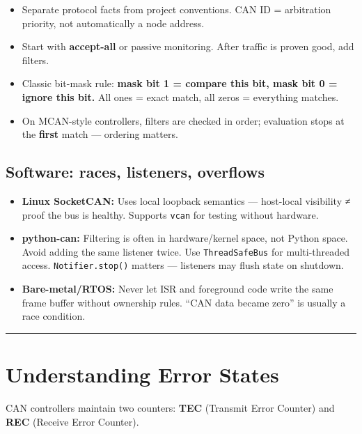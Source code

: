 \documentclass[12pt,a4paper,oneside]{report}
\providecommand{\tightlist}{\setlength{\itemsep}{0pt}\setlength{\parskip}{0pt}}
\begin{document}
\begin{itemize}
\tightlist
\item
  Separate protocol facts from project conventions. CAN ID = arbitration
  priority, not automatically a node address.
\item
  Start with \textbf{accept-all} or passive monitoring. After traffic is proven
  good, add filters.
\item
  Classic bit-mask rule: \textbf{mask bit 1 = compare this bit, mask bit 0 =
  ignore this bit.} All ones = exact match, all zeros = everything matches.
\item
  On MCAN-style controllers, filters are checked in order; evaluation stops at
  the \textbf{first} match --- ordering matters.
\end{itemize}

\subsection{Software: races, listeners,
overflows}\label{software-races-listeners-overflows}

\begin{itemize}
\tightlist
\item
  \textbf{Linux SocketCAN:} Uses local loopback semantics --- host-local
  visibility ≠ proof the bus is healthy. Supports \texttt{vcan} for testing
  without hardware.
\item
  \textbf{python-can:} Filtering is often in hardware/kernel space, not Python
  space. Avoid adding the same listener twice. Use \texttt{ThreadSafeBus} for
  multi-threaded access. \texttt{Notifier.stop()} matters --- listeners may
  flush state on shutdown.
\item
  \textbf{Bare-metal/RTOS:} Never let ISR and foreground code write the same
  frame buffer without ownership rules. ``CAN data became zero'' is usually a
  race condition.
\end{itemize}

\begin{center}\rule{0.5\linewidth}{0.5pt}\end{center}

\section{Understanding Error States}\label{understanding-error-states}

CAN controllers maintain two counters: \textbf{TEC} (Transmit Error Counter) and
\textbf{REC} (Receive Error Counter).
\end{document}
